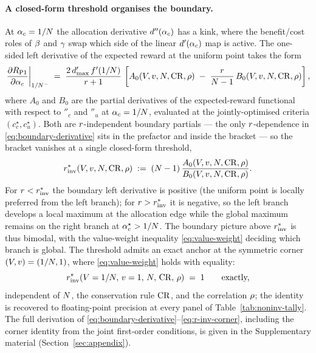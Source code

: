 \paragraph{A closed-form threshold organises the boundary.}
At $\alpha_c = 1/N$ the allocation derivative $d''(\alpha_c)$
has a kink, where the benefit/cost roles of $\beta$ and $\gamma$ swap
which side of the linear $d'(\alpha_c)$ map is active. The
one-sided left derivative of the expected reward at the uniform point
takes the form
%
\begin{equation}
  \left. \frac{\partial R_{\mathrm{P1}}}{\partial \alpha_c} \right|_{1/N^-}
  \;=\;
  \frac{2\, d'_{\max}\, f'(1/N)}{r + 1}\,
  \left[
    A_0(V, v, N, \mathrm{CR}, \rho)
    \;-\;
    \frac{r}{N - 1}\, B_0(V, v, N, \mathrm{CR}, \rho)
  \right],
  \label{eq:boundary-derivative}
\end{equation}
%
where $A_0$ and $B_0$ are the partial derivatives of the expected-reward
functional with respect to $\dprime_c$ and $\dprime_u$ at $\alpha_c =
1/N$, evaluated at the jointly-optimised criteria $(c_c^\star,
c_u^\star)$. Both are $r$-independent boundary partials --- the
only $r$-dependence in \eqref{eq:boundary-derivative} sits in the
prefactor and inside the bracket --- so the bracket vanishes at a single
closed-form threshold,
%
\begin{equation}
  r^{*}_{\mathrm{inv}}(V, v, N, \mathrm{CR}, \rho)
  \;:=\;
  (N - 1)\,
  \frac{A_0(V, v, N, \mathrm{CR}, \rho)}
       {B_0(V, v, N, \mathrm{CR}, \rho)}.
  \label{eq:r-inv}
\end{equation}
%
For $r < r^{*}_{\mathrm{inv}}$ the boundary left derivative is positive (the
uniform point is locally preferred from the left branch); for $r >
r^{*}_{\mathrm{inv}}$ it is negative, so the left branch develops a local maximum
at the allocation edge while the global maximum remains on the right
branch at $\alpha_c^\star > 1/N$. The boundary picture above
$r^{*}_{\mathrm{inv}}$ is thus bimodal, with the value-weight inequality
\eqref{eq:value-weight} deciding which branch is global. The threshold
admits an exact anchor at the symmetric corner $(V, v) =
(1/N, 1)$, where \eqref{eq:value-weight} holds with equality:
%
\begin{equation}
  r^{*}_{\mathrm{inv}}(V = 1/N,\, v = 1,\, N,\, \mathrm{CR},\, \rho)
  \;=\; 1
  \qquad \text{exactly,}
  \label{eq:r-inv-corner}
\end{equation}
%
independent of $N$, the conservation rule $\mathrm{CR}$, and the
correlation $\rho$; the identity is recovered to floating-point
precision at every panel of Table~\ref{tab:noninv-tally}. The full
derivation of \eqref{eq:boundary-derivative}--\eqref{eq:r-inv-corner},
including the corner identity from the joint first-order conditions, is
given in the Supplementary material (Section~\ref{sec:appendix}).

